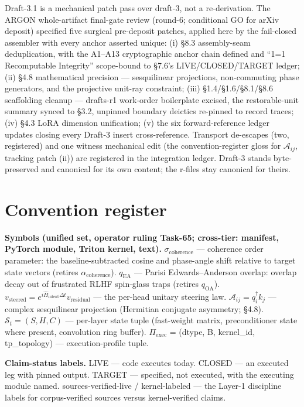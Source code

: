\documentclass[11pt]{article}
\newcommand{\live}{LIVE}
\newcommand{\closed}{CLOSED}
\newcommand{\target}{TARGET}
\begin{document}
Draft-3.1 is a mechanical patch pass over draft-3, not a re-derivation. The ARGON whole-artifact final-gate review (round-6; conditional GO for arXiv deposit) specified five surgical pre-deposit patches, applied here by the fail-closed assembler with every anchor asserted unique: (i) \S{}8.3 assembly-seam deduplication, with the A1--A13 cryptographic anchor chain defined and ``1=1 Recomputable Integrity'' scope-bound to \S{}7.6's \live{}/\closed{}/\target{} ledger; (ii) \S{}4.8 mathematical precision --- sesquilinear projections, non-commuting phase generators, and the projective unit-ray constraint; (iii) \S{}1.4/\S{}1.6/\S{}8.1/\S{}8.6 scaffolding cleanup --- drafts-r1 work-order boilerplate excised, the restorable-unit summary synced to \S{}3.2, unpinned boundary deictics re-pinned to record traces; (iv) \S{}4.3 LoRA dimension unification; (v) the six forward-reference ledger updates closing every Draft-3 insert cross-reference. Transport de-escapes (two, registered) and one witness mechanical edit (the convention-register gloss for \(\mathcal{A}_{ij}\), tracking patch (ii)) are registered in the integration ledger. Draft-3 stands byte-preserved and canonical for its own content; the r-files stay canonical for theirs.

\section{Convention register}\label{convention-register}

\textbf{Symbols (unified set, operator ruling Task-65; cross-tier: manifest, PyTorch module, Triton kernel, text).} \(\sigma_{\text{coherence}}\) --- coherence order parameter: the baseline-subtracted cosine and phase-angle shift relative to target state vectors (retires \(\alpha_{\text{coherence}}\)). \(q_{\text{EA}}\) --- Parisi Edwards--Anderson overlap: overlap decay out of frustrated RLHF spin-glass traps (retires \(q_{\text{OA}}\)). \(v_{\text{steered}} = e^{i\hat{H}_{\text{intent}}\Delta t} v_{\text{residual}}\) --- the per-head unitary steering law. \(\mathcal{A}_{ij} = q_i^\dagger k_j\) --- complex sesquilinear projection (Hermitian conjugate asymmetry; \S{}4.8). \(\mathcal{S}_t = (S, H, C)\) --- per-layer state tuple (fast-weight matrix, preconditioner state where present, convolution ring buffer). \(\Pi_{\text{exec}}\) = (dtype, B, kernel\_id, tp\_topology) --- execution-profile tuple.

\textbf{Claim-status labels.} \live{} --- code executes today. \closed{} --- an executed leg with pinned output. \target{} --- specified, not executed, with the executing module named. sources-verified-live / kernel-labeled --- the Layer-1 discipline labels for corpus-verified sources versus kernel-verified claims.
\end{document}
